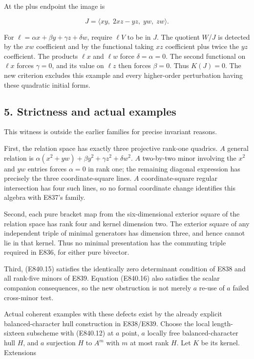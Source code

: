At the plus endpoint the image is

\[
                   J=\langle xy,\;2xz-yz,\;yw,\;zw\rangle.
 \tag{E840.17}
\]

For \(\ell=\alpha x+\beta y+\gamma z+\delta w\), require \(\ell V\) to
be in \(J\). The quotient \(W\)/\(J\) is detected by the \(xw\)
coefficient and by the functional taking \(xz\) coefficient plus twice
the \(yz\) coefficient. The products \(\ell x\) and \(\ell w\) force
\(\delta=\alpha=0\). The second functional on \(\ell x\) forces
\(\gamma=0\), and its value on \(\ell z\) then forces \(\beta=0\). Thus
\(K(J)=0\). The new criterion excludes this example and every
higher-order perturbation having these quadratic initial forms.

\subsection{5. Strictness and actual
examples}\label{SF-E840:strictness-and-actual-examples}

This witness is outside the earlier families for precise invariant
reasons.

First, the relation space has exactly three projective rank-one
quadrics. \(A\) general relation is
\(\alpha(x^2+yw)+\beta y^2+\gamma z^2+\delta w^2\). \(A\) two-by-two
minor involving the \(x^2\) and \(yw\) entries forces \(\alpha=0\) in
rank one; the remaining diagonal expression has precisely the three
coordinate-square lines. \(A\) coordinate-square regular intersection
has four such lines, so no formal coordinate change identifies this
algebra with E837's family.

Second, each pure bracket map from the six-dimensional exterior square
of the relation space has rank four and kernel dimension two. The
exterior square of any independent triple of minimal generators has
dimension three, and hence cannot lie in that kernel. Thus no minimal
presentation has the commuting triple required in E836, for either pure
bivector.

Third, (E840.15) satisfies the identically zero determinant condition of
E838 and all rank-five minors of E839. Equation (E840.16) also satisfies
the scalar companion consequences, so the new obstruction is not merely
\(a\) re-use of \(a\) failed cross-minor test.

Actual coherent examples with these defects exist by the already
explicit balanced-character hull construction in E838/E839. Choose the
local length-sixteen subscheme with (E840.12) at \(a\) point, \(a\)
locally free balanced-character hull \(H\), and \(a\) surjection \(H\)
to \(A^m\) with \(m\) at most rank \(H\). Let \(K\) be its kernel.
Extensions

